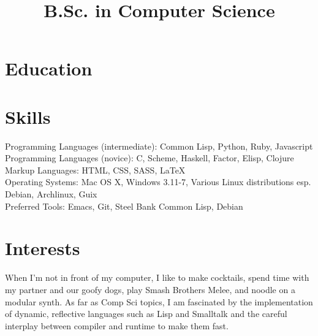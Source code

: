 \documentclass[margintitle,line]{res}
\begin{document}
\begin{resume}

\section{Education}

\title{B.Sc. in Computer Science}
\begin{position}
\end{position}


\section{Skills}

Programming Languages (intermediate): Common Lisp, Python, Ruby, Javascript \\
Programming Languages (novice): C, Scheme, Haskell, Factor, Elisp, Clojure \\
Markup Languages: HTML, CSS, SASS, LaTeX \\
Operating Systems: Mac OS X, Windows 3.11-7, Various Linux distributions
esp. Debian, Archlinux, Guix \\
Preferred Tools: Emacs, Git, Steel Bank Common Lisp, Debian \\


\section{Interests}

When I'm not in front of my computer, I like to make cocktails, spend
time with my partner and our goofy dogs, play Smash Brothers Melee,
and noodle on a modular synth. As far as Comp Sci topics, I am fascinated
by the implementation of dynamic, reflective languages such as Lisp and Smalltalk
and the careful interplay between compiler and runtime to make them fast.


\end{resume}
\end{document}
